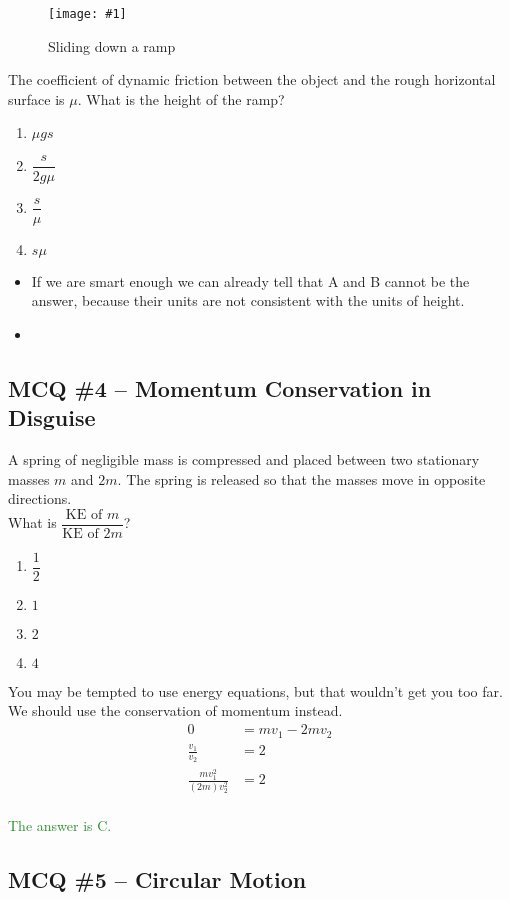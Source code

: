 \documentclass[a4paper,12pt]{article}
\newcommand{\lb}{\\[8pt]}
\newcommand{\img}[4]{\begin{center}
  \begin{figure}[H]
    \centering
    \texttt{[image: \#1]}
    \caption{#3}
    \label{fig:#4}
  \end{figure}
\end{center}}
\newcommand{\ans}[1]{\textcolor{ForestGreen}{The answer is #1.}}
\begin{document}
\img{ex/9.png}{0.7}{Sliding down a ramp}{ramp}

The coefficient of dynamic friction between the object and the rough horizontal surface is $\mu$.
What is the height of the ramp?

\begin{enumerate}[label=\Alph*.]
  \item $\mu g s$
  \item $\dfrac{s}{2g\mu}$
  \item $\dfrac{s}{\mu}$
  \item $s\mu$
\end{enumerate}

\begin{itemize}
  \item If we are smart enough we can already tell that A and B cannot be the answer, because their units are not consistent with the units of height.
  \item
\end{itemize}

\subsection{MCQ \#4 -- Momentum Conservation in Disguise}
A spring of negligible mass is compressed and placed between two stationary
masses $m$ and $2m$. The spring is released so that
the masses move in opposite directions.\lb
What is $\dfrac{\text{KE of $m$}}{\text{KE of $2m$}}$?
\begin{enumerate}[label=\Alph*.]
  \item $\dfrac{1}{2}$
  \item $1$
  \item $2$
  \item $4$
\end{enumerate}

You may be tempted to use energy equations, but that wouldn't get you too far. We should use the conservation of momentum instead.
\begin{align*}
  0                        & = m v_1 - 2m v_2 \\
  \frac{v_1}{v_2}          & = 2              \\
  \frac{mv_1^2}{(2m)v_2^2} & = 2              \\
\end{align*}

\ans{C}

\subsection{MCQ \#5 -- Circular Motion}
\end{document}
